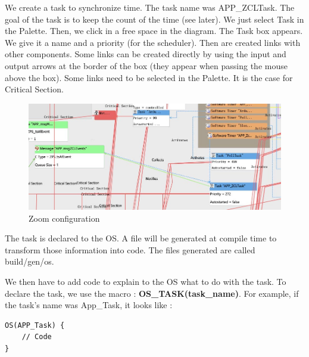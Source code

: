 We create a task to synchronize time. The task name was APP\_ZCLTask. The goal of the task is to keep the count of the time (see later). We just select Task in the Palette. Then, we click in a free space in the diagram. The Task box appears. We give it a name and a priority (for the scheduler). Then are created links with other components. Some links can be created directly by using the input and output arrows at the border of the box (they appear when passing the mouse above the box). Some links need to be selected in the Palette. It is the case for Critical Section.

\begin{figure}[ht]
\centering
\includegraphics[width=.6\linewidth]{zoom_softtimer}
\caption[Zoom configuration]{\label{f:zoom_softtimer}Zoom configuration}
\end{figure}

The task is declared to the OS. A file will be generated at compile time to transform those information into code. The files generated are called build/gen/os\*.

We then have to add code to explain to the OS what to do with the task. To declare the task, we use the macro : \textbf{OS\_TASK(task\_name)}. For example, if the task's name was App\_Task, it looks like :

\begin{lstlisting}[frame=single]
OS(APP_Task) {
    // Code
}
\end{lstlisting}

